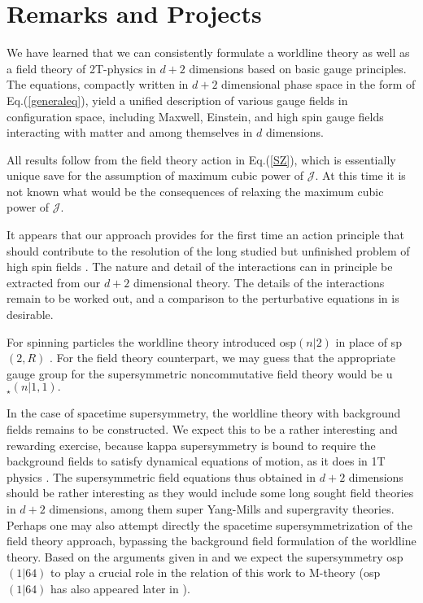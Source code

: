 \documentclass[a4paper,12pt]{article}
\begin{document}
\section{Remarks and Projects}

We have learned that we can consistently formulate a worldline
theory as well as a field theory of 2T-physics in $d+2$ dimensions
based on basic gauge principles. The equations, compactly written
in $d+2$ dimensional phase space in the form of
Eq.(\ref{generaleq}), yield a unified description of various
gauge fields in configuration space, including Maxwell, Einstein,
and high spin gauge fields interacting with matter and among
themselves in $ d $ dimensions.

All results follow from the field theory action in Eq.(\ref{SZ}),
which is essentially unique save for the assumption of maximum
cubic power of $ \mathcal{J}$. At this time it is not known what
would be the consequences of relaxing the maximum cubic power of
$\mathcal{J}$.

It appears that our approach provides for the first time an action principle
that should contribute to the resolution of the long studied but unfinished
problem of high spin fields \cite{vasil}\cite{segal}\cite{highspin}\cite
{sezgin}. The nature and detail of the interactions can in principle be
extracted from our $d+2$ dimensional theory. The details of the interactions
remain to be worked out, and a comparison to the perturbative equations in
\cite{vasil} is desirable.

For spinning particles the worldline theory introduced osp$\left( n|2\right)
$ in place of sp$\left( 2,R\right) $ \cite{spin2t}. For the field theory
counterpart, we may guess that the appropriate gauge group for the
supersymmetric noncommutative field theory would be u$_{\star }\left(
n|1,1\right) .$

In the case of spacetime supersymmetry, the worldline theory with
background fields remains to be constructed. We expect this to be
a rather interesting and rewarding exercise, because kappa
supersymmetry is bound to require the background fields to satisfy
dynamical equations of motion, as it does in 1T physics
\cite{wittsusy}. The supersymmetric field equations thus obtained
in $d+2$ dimensions should be rather interesting as they would
include some long sought field theories in $d+2$ dimensions, among
them super Yang-Mills and supergravity theories. Perhaps one may
also attempt directly the spacetime supersymmetrization of the
field theory approach, bypassing the background field formulation
of the worldline theory. Based on the arguments given in
\cite{super2t}\cite{survey2T} and \cite{S-theory} we expect the
supersymmetry osp$\left( 1|64\right) $ to play a crucial role in
the relation of this work to M-theory (osp$\left( 1|64\right) $
has also appeared later in \cite{west}\cite{ferrara}).
\end{document}
